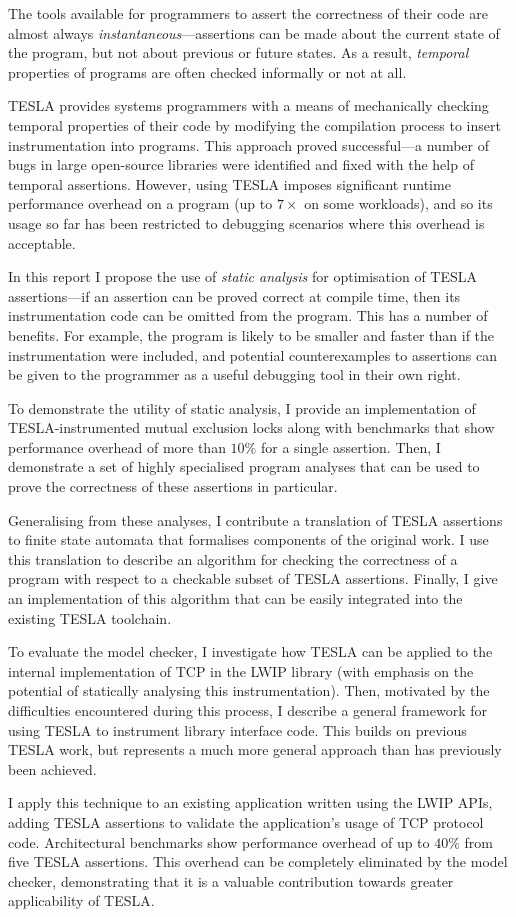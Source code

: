 The tools available for programmers to assert the correctness of their code are
almost always \emph{instantaneous}---assertions can be made about the current
state of the program, but not about previous or future states. As a result,
\emph{temporal} properties of programs are often checked informally or not at
all.

TESLA \cite{anderson_tesla:_2014} provides systems programmers with a means of
mechanically checking temporal properties of their code by modifying the
compilation process to insert instrumentation into programs. This approach
proved successful---a number of bugs in large open-source libraries were
identified and fixed with the help of temporal assertions. However, using TESLA
imposes significant runtime performance overhead on a program (up to $7\times$
on some workloads), and so its usage so far has been restricted to debugging
scenarios where this overhead is acceptable.

In this report I propose the use of \emph{static analysis} for optimisation of
TESLA assertions---if an assertion can be proved correct at compile time, then
its instrumentation code can be omitted from the program. This has a number of
benefits. For example, the program is likely to be smaller and faster than if
the instrumentation were included, and potential counterexamples to assertions
can be given to the programmer as a useful debugging tool in their own right.

To demonstrate the utility of static analysis, I provide an implementation of
TESLA-instrumented mutual exclusion locks along with benchmarks that show
performance overhead of more than $10\%$ for a single assertion. Then, I
demonstrate a set of highly specialised program analyses that can be used to
prove the correctness of these assertions in particular. 

Generalising from these analyses, I contribute a translation of TESLA
assertions to finite state automata that formalises components of the original
work. I use this translation to describe an algorithm for checking the
correctness of a program with respect to a checkable subset of TESLA assertions.
Finally, I give an implementation of this algorithm that can be easily
integrated into the existing TESLA toolchain.

To evaluate the model checker, I investigate how TESLA can be applied to the
internal implementation of TCP in the LWIP library \cite{dunkels_design_2001}
(with emphasis on the potential of statically analysing this instrumentation).
Then, motivated by the difficulties encountered during this process, I describe
a general framework for using TESLA to instrument library interface code. This
builds on previous TESLA work, but represents a much more general approach than
has previously been achieved.

I apply this technique to an existing application written using the LWIP APIs,
adding TESLA assertions to validate the application's usage of TCP protocol
code. Architectural benchmarks show performance overhead of up to $40\%$ from
five TESLA assertions. This overhead can be completely eliminated by the model
checker, demonstrating that it is a valuable contribution towards greater
applicability of TESLA.
